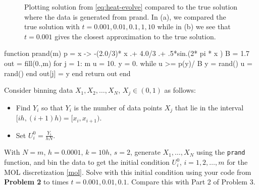\documentclass[12pt]{report}
\begin{document}
\begin{solution}
\begin{figure}[H]
\begin{subfigure}[b]{0.5\linewidth}
        \caption{}
        \label{fig3:b}
        \vspace{4ex}
      \end{subfigure}
      \caption{Plotting solution from \ref{eq:heat-evolve} compared to the true solution where the data is generated from prand. In (a), we compared the true solution with $t=0.001,0.01,0.1,1,10$ while in (b) we see that $t=0.001$ gives the closest approximation to the true solution.}
      \label{fig3}
  \end{figure}

  \begin{python}
  function prand(m)
    p = x -> -(2.0/3)* x .+ 4.0/3 .+ .5*sin.(2* pi * x )
    B = 1.7
    out = fill(0.,m)
        for j = 1: m
            u = 10.
            y = 0.
            while u >= p(y)/ B
                y = rand()
                u = rand()
            end
        out[j] = y
    end
    return out
  end
  \end{python}


\end{solution}

\newpage



\begin{problem}
    Consider binning data $X_1,X_2,\ldots,X_N$, $X_j \in (0,1)$ as follows:
  \begin{itemize}
  \item Find $Y_i$ so that $Y_i$ is the number of data points $X_j$ that lie in the interval $[ih,(i+1)h) = [x_i,x_{i+1})$.
  \item Set $U_i^0 = \frac{Y_i}{h N}$.
  \end{itemize}
  With $N = m$, $h = 0.0001$, $k = 10h$, $s = 2$, generate $X_1,\ldots,X_N$ using the {\tt prand} function, and bin the data to get the initial condition $U_i^0$, $i = 1,2,\ldots,m$ for the MOL discretization \eqref{mol}.  Solve with this initial condition using your code from {\textbf{Problem 2}} to times $t = 0.001,0.01,0.1$.  Compare this with Part 2 of Problem 3.
\end{problem}
\end{document}
